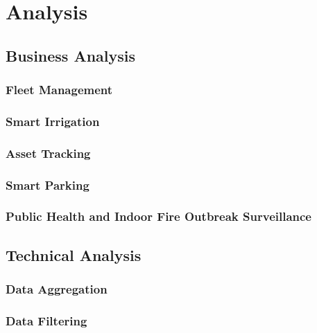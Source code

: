 
\chapter{Analysis} %

\label{chap:Chapter3} %


\section{Business Analysis}

\subsection{Fleet Management}

\subsection{Smart Irrigation}

\subsection{Asset Tracking}

\subsection{Smart Parking}

\subsection{Public Health and Indoor Fire Outbreak Surveillance}

\section{Technical Analysis}

\subsection{Data Aggregation}

\subsection{Data Filtering}

